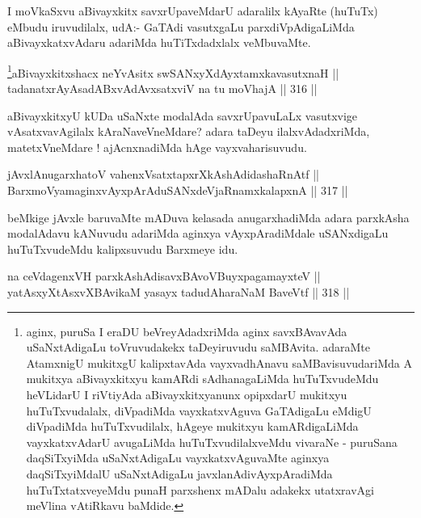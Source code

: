 \begin{artha}
I moVkaSxvu aBivayxkitx savxrUpaveMdarU adaralilx kAyaRte (huTuTx)
eMbudu iruvudilalx, udA:- GaTAdi vasutxgaLu parxdiVpAdigaLiMda
aBivayxkatxvAdaru adariMda huTiTxdadxlalx veMbuvaMte.
\end{artha}



\begin{shl}
\footnote{aginx, puruSa I eraDU beVreyAdadxriMda aginx savxBAvavAda uSaNxtAdigaLu toVruvudakekx taDeyiruvudu saMBAvita. adaraMte AtamxnigU mukitxgU kalipxtavAda vayxvadhAnavu saMBavisuvudariMda A mukitxya aBivayxkitxyu kamARdi sAdhanagaLiMda huTuTxvudeMdu heVLidarU I riVtiyAda aBivayxkitxyanunx opipxdarU mukitxyu huTuTxvudalalx, diVpadiMda vayxkatxvAguva GaTAdigaLu eMdigU diVpadiMda huTuTxvudilalx, hAgeye mukitxyu kamARdigaLiMda vayxkatxvAdarU avugaLiMda huTuTxvudilalxveMdu vivaraNe - puruSana daqSiTxyiMda uSaNxtAdigaLu vayxkatxvAguvaMte aginxya daqSiTxyiMdalU uSaNxtAdigaLu javxlanAdivAyxpAradiMda huTuTxtatxveyeMdu punaH parxshenx mADalu adakekx utatxravAgi meVlina vAtiRkavu baMdide.}aBivayxkitxshacx neYvAsitx swSANxyXdAyxtamxkavasutxnaH || \\
tadanatxrAyAsadABxvAdAvxsatxviV na tu moVhajA \hfill || 316 ||  
\end{shl}

\begin{artha}
aBivayxkitxyU kUDa uSaNxte modalAda savxrUpavuLaLx
vasutxvige vAsatxvavAgilalx kAraNaveVneMdare? adara taDeyu
ilalxvAdadxriMda, matetxVneMdare ! ajAcnxnadiMda hAge
vayxvaharisuvudu.
\end{artha}

\begin{shl}
jAvxlAnugarxhatoV vahenxVsatxtapxrXkAshAdidashaRnAtf || \\
BarxmoV\s yamaginxvAyxpArAduSANxdeVjaRnamxkalapxnA \hfill || 317 ||  
\end{shl}

\begin{artha}
beMkige jAvxle baruvaMte mADuva kelasada anugarxhadiMda adara
parxkAsha modalAdavu kANuvudu adariMda aginxya vAyxpAradiMdale
uSANxdigaLu huTuTxvudeMdu kalipxsuvudu Barxmeye idu.
\end{artha}

\begin{shl}
na ceVdagenxVH parxkAshAdisavxBAvoV\s BuyxpagamayxteV || \\
yatAsxyXtAsxvXBAvikaM yasayx tadudAharaNaM BaveVtf \hfill || 318 ||  
\end{shl}

